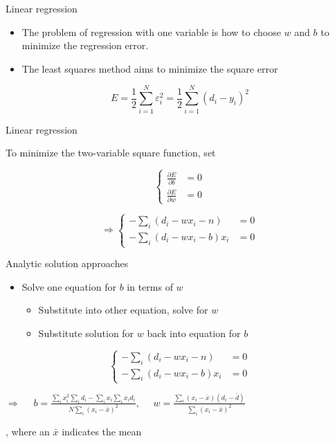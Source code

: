 \documentclass[notes]{beamer}
\providecommand{\tightlist}{%
  \setlength{\itemsep}{0pt}\setlength{\parskip}{0pt}}
\begin{document}
\begin{frame}{Linear regression}

\begin{itemize}
\tightlist
\item
  The problem of regression with one variable is how to choose \(w\) and
  \(b\) to minimize the regression error.
\item
  The least squares method aims to minimize the square error
\end{itemize}

\[E=\frac{1}{2}\sum_{i=1}^{N} \varepsilon_i^2 = \frac{1}{2} \sum_{i=1}^{N} (d_i -y_i)^2\]

\end{frame}

\begin{frame}{Linear regression}

To minimize the two-variable square function, set

\[\left\{\begin{array}{cc}
\frac{\partial E}{\partial b} & =0 \\ 
\frac{\partial E}{\partial w} & =0 
\end{array} \right.\]

\[\Rightarrow \left\{\begin{array}{cc}
-\sum_{i}(d_i -wx_i -n) & =0 \\  
-\sum_{i} (d_i -wx_i -b) x_i & =0 
\end{array} \right.\]

\end{frame}

\begin{frame}{Analytic solution approaches}

\begin{itemize}
\tightlist
\item
  Solve one equation for \(b\) in terms of \(w\)

  \begin{itemize}
  \tightlist
  \item
    Substitute into other equation, solve for \(w\)
  \item
    Substitute solution for \(w\) back into equation for \(b\)
  \end{itemize}
\end{itemize}

\[\left\{\begin{array}{cc}
-\sum_{i}(d_i -wx_i -n) & =0 \\  
-\sum_{i} (d_i -wx_i -b) x_i & =0 
\end{array} \right.\]

\(\Rightarrow \quad\) \pause
\(b=\frac{\sum_i x_i^2 \sum_i d_i - \sum_i x_i \sum_i x_i d_i}{N \sum_i (x_i - \bar{x} )^2} , \quad\)
\(w=\frac{\sum_i (x_i - \bar{x}) (d_i - \bar{d}) }{\sum_i (x_i - \bar{x} )^2 }\)

, where an \(\bar{x}\) indicates the mean

\end{frame}
\end{document}
